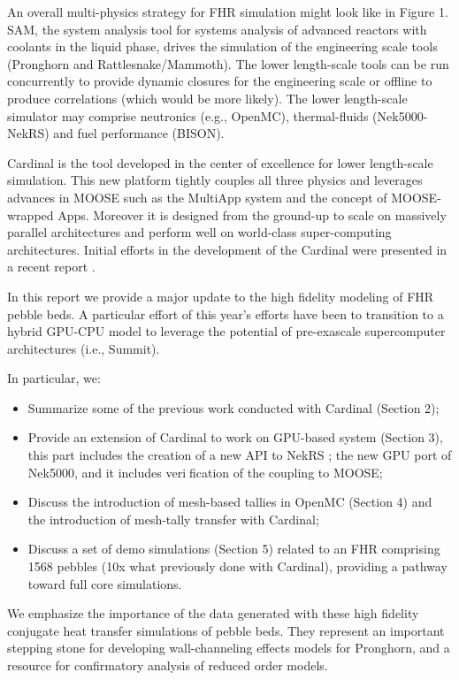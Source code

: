 An overall multi-physics strategy for FHR simulation might look like in Figure 1. SAM, the system analysis tool for systems analysis of advanced reactors with coolants in the liquid phase, drives the simulation of the engineering scale tools (Pronghorn and Rattlesnake/Mammoth). The lower length-scale tools can be run concurrently to provide dynamic closures for the engineering scale or offline to produce correlations (which would be more likely). The lower length-scale simulator may comprise neutronics (e.g., OpenMC), thermal-fluids (Nek5000-NekRS) and fuel performance (BISON).

Cardinal is the tool developed in the center of excellence for lower length-scale simulation. This new platform tightly couples all three physics and leverages advances in MOOSE \cite{gaston2009moose} such as the MultiApp system and the concept of MOOSE-wrapped Apps. Moreover it is designed from the ground-up to scale on massively parallel architectures and perform well on world-class super-computing architectures. Initial efforts in the development of the Cardinal were presented in a recent report \cite{cardinal}.

In this report we provide a major update to the high fidelity modeling of FHR pebble beds. A particular effort of this year's efforts have been to transition to a hybrid GPU-CPU model to leverage the potential of pre-exascale supercomputer architectures (i.e., Summit).

In particular, we:
\begin{itemize}
\item Summarize some of the previous work conducted with Cardinal (Section 2);
\item Provide an extension of Cardinal to work on GPU-based system (Section 3), this part includes the creation of a new API to NekRS \cite{toward}; the new GPU port of Nek5000, and it includes  verification of the coupling to MOOSE;
\item Discuss the introduction of mesh-based tallies in OpenMC (Section 4) and the introduction of mesh-tally transfer with Cardinal;
\item Discuss a set of demo simulations (Section 5) related to an FHR comprising 1568 pebbles (10x what previously done with Cardinal), providing a pathway toward full core simulations.
\end{itemize}

We emphasize the importance of the data generated with these high fidelity conjugate heat transfer simulations of pebble beds. They represent an important stepping stone for developing wall-channeling effects models for Pronghorn, and a resource for confirmatory analysis of reduced order models.
